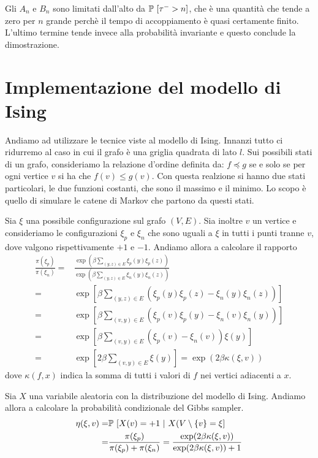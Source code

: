 \documentclass[]{marticle}
\begin{document}
Gli $A_n$ e $B_n$ sono limitati dall'alto da $\mathbb{P}\ [\tau^- > n]$, che \`e una
quantit\`a che tende a zero per $n$ grande perch\`e il tempo di accoppiamento
\`e quasi certamente finito. L'ultimo termine tende invece alla probabilit\`a
invariante e questo conclude la dimostrazione.


\section{Implementazione del modello di Ising}

Andiamo ad utilizzare le tecnice viste al modello di Ising. Innanzi tutto ci
ridurremo al caso in cui il grafo \`e una griglia quadrata di lato $l$. Sui
possibili stati di un grafo, consideriamo la relazione d'ordine definita da:
$f \preceq g$ se e solo se per ogni vertice $v$ si ha che $f(v) \leq g(v)$.
Con questa realzione si hanno due stati particolari, le due funzioni costanti,
che sono il massimo e il minimo. Lo scopo \`e quello di simulare le catene di
Markov che partono da questi stati. 

Sia $\xi$ una possibile configurazione sul grafo $(V,E)$. Sia inoltre $v$ un
vertice e consideriamo le configurazioni $\xi_p$ e $\xi_n$ che sono uguali a
$\xi$ in tutti i punti tranne $v$, dove valgono rispettivamente $+1$ e $-1$.
Andiamo allora a calcolare il rapporto
\begin{align*}
    \frac{\pi(\xi_p)}{\pi(\xi_n)} =& 
    \frac{\exp (\beta \sum_{(y,z)\in E} \xi_p(y)\xi_p(z))} {\exp
            (\beta\sum_{(y,z)\in E} \xi_n(y)\xi_n(z))} \\
    =& \exp \left[\beta\sum_{(y,z)\in E}
        \left(\xi_p(y)\xi_p(z)-\xi_n(y)\xi_n(z)\right)\right ]\\
    =& \exp \left[\beta\sum_{(v,y)\in E}
        \left(\xi_p(v)\xi_p(y)-\xi_n(v)\xi_n(y)\right)\right ]\\
    =& \exp \left[\beta\sum_{(v,y)\in E}
        \left(\xi_p(v)-\xi_n(v)\right)\xi(y)\right ]\\
    =& \exp \left[2\beta\sum_{(v,y)\in E} \xi(y)\right ]
    = \exp \left(2\beta\kappa(\xi,v)\right)
\end{align*}
dove $\kappa(f,x)$ indica la somma di tutti i valori di $f$ nei vertici
adiacenti a $x$.

Sia $X$ una variabile aleatoria con la distribuzione del modello di Ising.
Andiamo allora a calcolare la probabilit\`a condizionale del Gibbs sampler.
\begin{align*}
    \eta(\xi,v) =&
    \mathbb{P}\ [X(v)=+1\ |\ X(V\setminus \{v\}=\xi]\\
    =& \frac{\pi(\xi_p)}{\pi(\xi_p)+\pi(\xi_n)}
    = \frac{\exp(2\beta\kappa(\xi,v))}{\exp(2\beta\kappa(\xi,v))+1}
\end{align*}
\end{document}

